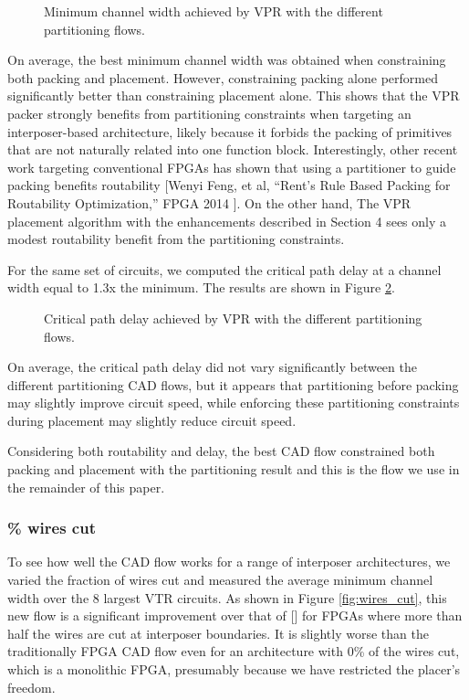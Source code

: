 \begin{figure}[!htbp]
\centering

\caption{Minimum channel width achieved by VPR with the different partitioning flows.}
\label{fig:flows_mcw}
\end{figure}

On average, the best minimum channel width was obtained when constraining both packing and placement. However, constraining packing alone performed significantly better than constraining placement alone. This shows that the VPR packer strongly benefits from partitioning constraints when targeting an interposer-based architecture, likely because it forbids the packing of primitives that are not naturally related into one function block. Interestingly, other recent work targeting conventional FPGAs has shown that using a partitioner to guide packing benefits routability [Wenyi Feng, et al, “Rent’s Rule Based Packing for Routability Optimization,” FPGA 2014 ]. On the other hand, The VPR placement algorithm with the enhancements described in Section 4 sees only a modest routability benefit from the partitioning constraints.

For the same set of circuits, we computed the critical path delay at a channel width equal to 1.3x the minimum. The results are shown in Figure \ref{fig:flows_crit_path}.

\begin{figure}[!htbp]
\centering

\caption{Critical path delay achieved by VPR with the different partitioning flows.}
\label{fig:flows_crit_path}
\end{figure}

On average, the critical path delay did not vary significantly between the different partitioning CAD flows, but it appears that partitioning before packing may slightly improve circuit speed, while enforcing these partitioning constraints during placement may slightly reduce circuit speed.

Considering both routability and delay, the best CAD flow constrained both packing and placement with the partitioning result and this is the flow we use in the remainder of this paper.

\subsubsection{\% wires cut}
To see how well the CAD flow works for a range of interposer architectures, we varied the fraction of wires cut and measured the average minimum channel width over the 8 largest VTR circuits. As shown in Figure \ref{fig:wires_cut}, this new flow is a significant improvement over that of [] for FPGAs where more than half the wires are cut at interposer boundaries. It is slightly worse than the traditionally FPGA CAD flow even for an architecture with 0\% of the wires cut, which is a monolithic FPGA, presumably because we have restricted the placer's freedom.


